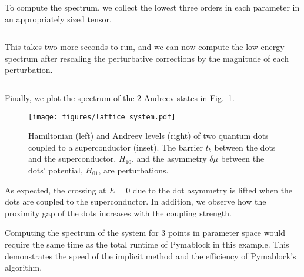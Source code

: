To compute the spectrum, we collect the lowest three orders in each parameter in an appropriately sized tensor.
%
\inputminted[firstline=69, lastline=69]{python}{code_figures/lattice_system.py}
%
This takes two more seconds to run, and we can now compute the low-energy spectrum after rescaling the perturbative corrections by the magnitude of each perturbation.
%
\inputminted[firstline=72, lastline=77]{python}{code_figures/lattice_system.py}
%
Finally, we plot the spectrum of the $2$ Andreev states in Fig.~\ref{fig:QD_spectrum}.
%
\begin{figure}[h!]
\centering
\texttt{[image: figures/lattice\_system.pdf]}
\caption{
    Hamiltonian (left) and Andreev levels (right) of two quantum dots coupled to a superconductor (inset).
    The barrier $t_b$ between the dots and the superconductor, $H_{10}$, and the asymmetry $\delta \mu$ between the dots' potential, $H_{01}$, are perturbations.
}
\label{fig:QD_spectrum}
\end{figure}
%
As expected, the crossing at $E=0$ due to the dot asymmetry is lifted when the dots are coupled to the superconductor.
In addition, we observe how the proximity gap of the dots increases with the coupling strength.

Computing the spectrum of the system for $3$ points in parameter space would require the same time as the total runtime of Pymablock in this example.
This demonstrates the speed of the implicit method and the efficiency of Pymablock's algorithm.
